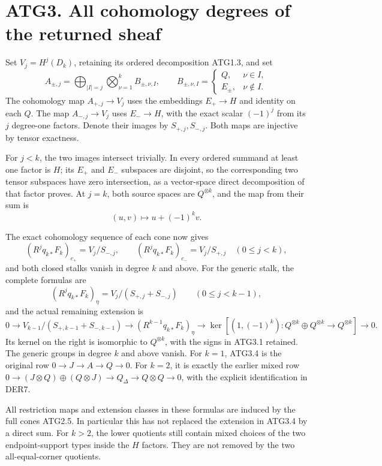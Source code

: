\section{ATG3. All cohomology degrees of the returned
sheaf}\label{atg3.-all-cohomology-degrees-of-the-returned-sheaf}

Set \(V_j=H^j(D_k)\), retaining its ordered decomposition ATG1.3, and
set \[
A_{\pm,j}=
\bigoplus_{|I|=j}
\bigotimes_{\nu=1}^k B_{\pm,\nu,I},\qquad
B_{\pm,\nu,I}=\begin{cases}Q,&\nu\in I,\\E_\pm,&\nu\notin I.\end{cases}
\] The cohomology map \(A_{+,j}\to V_j\) uses the embeddings
\(E_+\to H\) and identity on each \(Q\). The map \(A_{-,j}\to V_j\) uses
\(E_-\to H\), with the exact scalar \((-1)^j\) from its \(j\) degree-one
factors. Denote their images by \(S_{+,j},S_{-,j}\). Both maps are
injective by tensor exactness.

For \(j<k\), the two images intersect trivially. In every ordered
summand at least one factor is \(H\); its \(E_+\) and \(E_-\) subspaces
are disjoint, so the corresponding two tensor subspaces have zero
intersection, as a vector-space direct decomposition of that factor
proves. At \(j=k\), both source spaces are \(Q^{\otimes k}\), and the
map from their sum is \[
(u,v)\longmapsto u+(-1)^kv.
\tag{ATG3.1}
\]

The exact cohomology sequence of each cone now gives \[
(R^jq_{k*}F_k)_{c_+}=V_j/S_{-,j},\qquad
(R^jq_{k*}F_k)_{c_-}=V_j/S_{+,j}\quad(0\le j<k),
\tag{ATG3.2}
\] and both closed stalks vanish in degree \(k\) and above. For the
generic stalk, the complete formulas are \[
(R^jq_{k*}F_k)_\eta
=V_j/(S_{+,j}+S_{-,j})\qquad(0\le j<k-1),
\tag{ATG3.3}
\] and the actual remaining extension is \[
\boxed{
0\to V_{k-1}/(S_{+,k-1}+S_{-,k-1})
\to (R^{k-1}q_{k*}F_k)_\eta
\to \ker[(1,(-1)^k):Q^{\otimes k}\oplus Q^{\otimes k}\to Q^{\otimes k}]
\to0.}
\tag{ATG3.4}
\] Its kernel on the right is isomorphic to \(Q^{\otimes k}\), with the
signs in ATG3.1 retained. The generic groups in degree \(k\) and above
vanish. For \(k=1\), ATG3.4 is the original row
\(0\to J\to A\to Q\to0\). For \(k=2\), it is exactly the earlier mixed
row
\(0\to(J\otimes Q)\oplus(Q\otimes J)\to Q_\Delta\to Q\otimes Q\to0\),
with the explicit identification in DER7.

All restriction maps and extension classes in these formulas are induced
by the full cones ATG2.5. In particular this has not replaced the
extension in ATG3.4 by a direct sum. For \(k>2\), the lower quotients
still contain mixed choices of the two endpoint-support types inside the
\(H\) factors. They are not removed by the two all-equal-corner
quotients.

